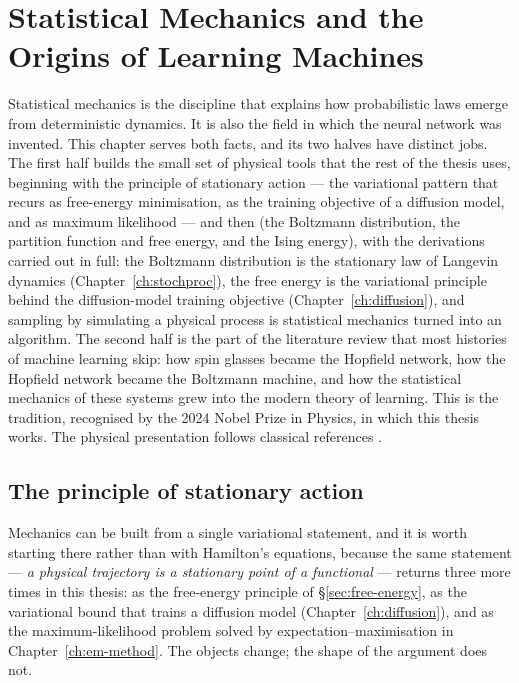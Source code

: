 \chapter{Statistical Mechanics and the Origins of Learning Machines}
\label{ch:statmech}\label{ch:background}

Statistical mechanics is the discipline that explains how probabilistic
laws emerge from deterministic dynamics. It is also the field in which the
neural network was invented. This chapter serves both facts, and its two
halves have distinct jobs. The first half builds the small set of physical
tools that the rest of the thesis uses, beginning with the principle of
stationary action --- the variational pattern that recurs as free-energy
minimisation, as the training objective of a diffusion model, and as
maximum likelihood --- and then (the Boltzmann distribution, the
partition function and free energy, and the Ising energy), with the
derivations carried out in full: the Boltzmann distribution is the
stationary law of Langevin dynamics (Chapter~\ref{ch:stochproc}), the free
energy is the variational principle behind the diffusion-model training
objective (Chapter~\ref{ch:diffusion}), and sampling by simulating a
physical process is statistical mechanics turned into an algorithm. The
second half is the part of the literature review that most histories of
machine learning skip: how spin glasses became the Hopfield network, how
the Hopfield network became the Boltzmann machine, and how the statistical
mechanics of these systems grew into the modern theory of learning. This
is the tradition, recognised by the 2024 Nobel Prize in Physics, in which
this thesis works. The physical presentation follows classical references
\citep{goldstein2002classical, landau1980statistical}.

\section{The principle of stationary action}\label{sec:action}

Mechanics can be built from a single variational statement, and it is worth
starting there rather than with Hamilton's equations, because the same
statement --- \emph{a physical trajectory is a stationary point of a
functional} --- returns three more times in this thesis: as the free-energy
principle of \S\ref{sec:free-energy}, as the variational bound that trains a
diffusion model (Chapter~\ref{ch:diffusion}), and as the maximum-likelihood
problem solved by expectation--maximisation in
Chapter~\ref{ch:em-method}. The objects change; the shape of the argument
does not.

